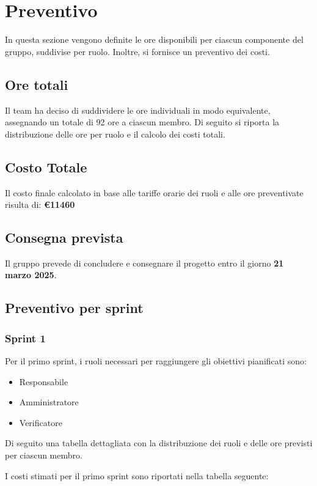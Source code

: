 \section{Preventivo}
In questa sezione vengono definite le ore disponibili per ciascun componente del gruppo, suddivise per ruolo. Inoltre, si fornisce un preventivo dei costi.

\subsection{Ore totali}
Il team ha deciso di suddividere le ore individuali in modo equivalente, assegnando un totale di 92 ore a ciascun membro. Di seguito si riporta la distribuzione delle ore per ruolo e il calcolo dei costi totali.




\subsection{Costo Totale }
Il costo finale calcolato in base alle tariffe orarie dei ruoli e alle ore preventivate risulta di: \textbf{\euro 11460}

\subsection{Consegna prevista}
Il gruppo prevede di concludere e consegnare il progetto entro il giorno \textbf{21 marzo 2025}.

 \subsection{Preventivo per sprint}

 \subsubsection{Sprint 1}
Per il primo sprint, i ruoli necessari per raggiungere gli obiettivi pianificati sono:
 \begin{itemize}
     \item Responsabile
     \item Amministratore
     \item Verificatore
 \end{itemize} 

\newpage
Di seguito una tabella dettagliata con la distribuzione dei ruoli e delle ore previsti per ciascun membro.




I costi stimati per il primo sprint sono riportati nella tabella seguente:




